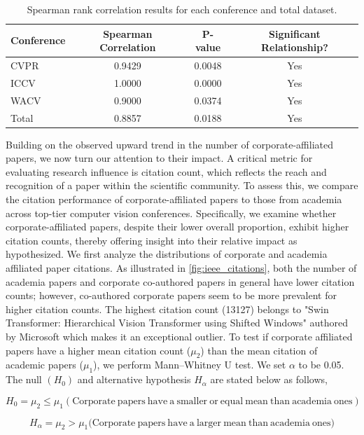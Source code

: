 \documentclass{article}
\begin{document}
\begin{table}[ht]
\centering
\begin{tabular}{|l|c|c|c|}
\hline
\textbf{Conference} & \textbf{Spearman Correlation} & \textbf{P-value} & \textbf{Significant Relationship?} \\ \hline
CVPR & 0.9429 & 0.0048 & Yes \\ \hline
ICCV & 1.0000 & 0.0000 & Yes \\ \hline
WACV & 0.9000 & 0.0374 & Yes \\ \hline
Total & 0.8857 & 0.0188 & Yes \\ \hline
\end{tabular}
\caption{Spearman rank correlation results for each conference and total dataset.}
\label{tab:spearman_results}
\end{table}

Building on the observed upward trend in the number of corporate-affiliated papers, we now turn our attention to their impact. A critical metric for evaluating research influence is citation count, which reflects the reach and recognition of a paper within the scientific community. To assess this, we compare the citation performance of corporate-affiliated papers to those from academia across top-tier computer vision conferences. Specifically, we examine whether corporate-affiliated papers, despite their lower overall proportion, exhibit higher citation counts, thereby offering insight into their relative impact as hypothesized. We first analyze the distributions of corporate and academia affiliated paper citations. As illustrated in \cref{fig:ieee_citations}, both the number of academia papers and corporate co-authored papers in general have lower citation counts; however, co-authored corporate papers seem to be more prevalent for higher citation counts. The highest citation count (13127) belongs to "Swin Transformer: Hierarchical Vision Transformer using Shifted Windows" authored by Microsoft which makes it an exceptional outlier. To test if corporate affiliated papers have a higher mean citation count ($\mu_2$) than the mean citation of academic papers ($\mu_1$), we perform Mann–Whitney U test. We set $\alpha$ to be 0.05. The null $(H_0)$ and alternative hypothesis $H_\alpha$ are stated below as follows,

\[
H_0 = \mu_2 \leq \mu_1 (\mathrm{Corporate \ papers\ have \ a \ smaller \ or \ equal \ mean \ than \ academia \ ones})
\]

\[
H_\alpha = \mu_2 > \mu_1 (\mathrm{Corporate \ papers\ have \ a \ larger \ mean\ than \ academia \ ones)}
\]
\end{document}
